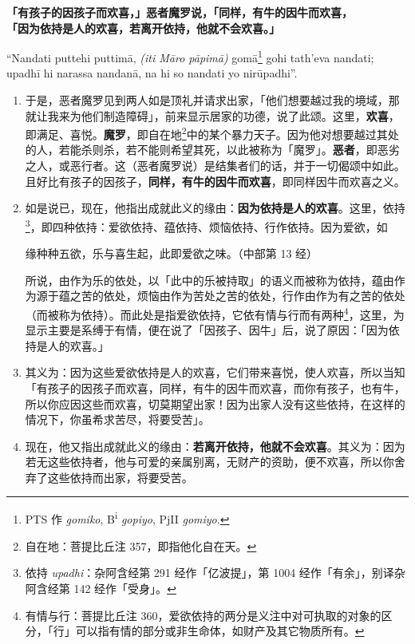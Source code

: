 \textbf{「有孩子的因孩子而欢喜，」恶者魔罗说，「同样，有牛的因牛而欢喜，\\}
\textbf{「因为依持是人的欢喜，若离开依持，他就不会欢喜。」}

“Nandati puttehi puttimā, \textit{(iti Māro pāpimā)} gomā\footnote{PTS 作 \textit{gomiko}, B\textsuperscript{i} \textit{gopiyo}, PjII \textit{gomiyo}.} gohi tath’eva nandati;\\
upadhī hi narassa nandanā, na hi so nandati yo nirūpadhi”. %

\begin{enumerate}\item 于是，恶者魔罗见到两人如是顶礼并请求出家，「他们想要越过我的境域，那就让我来为他们制造障碍」，前来显示居家的功德，说了此颂。这里，\textbf{欢喜}，即满足、喜悦。\textbf{魔罗}，即自在地\footnote{自在地：菩提比丘注 357，即指他化自在天。}中的某个暴力天子。因为他对想要越过其处的人，若能杀则杀，若不能则希望其死，以此被称为「魔罗」。\textbf{恶者}，即恶劣之人，或恶行者。这（恶者魔罗说）是结集者们的话，并于一切偈颂中如此。且好比有孩子的因孩子，\textbf{同样，有牛的因牛而欢喜}，即同样因牛而欢喜之义。
\item 如是说已，现在，他指出成就此义的缘由：\textbf{因为依持是人的欢喜}。这里，依持\footnote{依持 \textit{upadhi}：杂阿含经第 291 经作「亿波提」，第 1004 经作「有余」，别译杂阿含经第 142 经作「受身」。}，即四种依持：爱欲依持、蕴依持、烦恼依持、行作依持。因为爱欲，如\begin{quoting}缘种种五欲，乐与喜生起，此即爱欲之味。（中部第 13 经）\end{quoting}所说，由作为乐的依处，以「此中的乐被持取」的语义而被称为依持，蕴由作为源于蕴之苦的依处，烦恼由作为苦处之苦的依处，行作由作为有之苦的依处（而被称为依持）。而此处是指爱欲依持，它依有情与行而有两种\footnote{有情与行：菩提比丘注 360，爱欲依持的两分是义注中对可执取的对象的区分，「行」可以指有情的部分或非生命体，如财产及其它物质所有。}，这里，为显示主要是系缚于有情，便在说了「因孩子、因牛」后，说了原因：「因为依持是人的欢喜。」
\item 其义为：因为这些爱欲依持是人的欢喜，它们带来喜悦，使人欢喜，所以当知「有孩子的因孩子而欢喜，同样，有牛的因牛而欢喜，而你有孩子，也有牛，所以你应因这些而欢喜，切莫期望出家！因为出家人没有这些依持，在这样的情况下，你虽希求苦尽，将要受苦」。
\item 现在，他又指出成就此义的缘由：\textbf{若离开依持，他就不会欢喜}。其义为：因为若无这些依持者，他与可爱的亲属别离，无财产的资助，便不欢喜，所以你舍弃了这些依持而出家，将要受苦。\end{enumerate}

